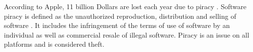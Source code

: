 According to Apple, 11 billion Dollars are lost each year due to piracy \cite{applePiracy}.
Software piracy is defined as the unauthorized reproduction, distribution and selling of software \cite{applePiracy}.
It includes the infringement of the terms of use of software by an individual as well as commercial resale of illegal software.
Piracy is an issue on all platforms and is considered theft.
